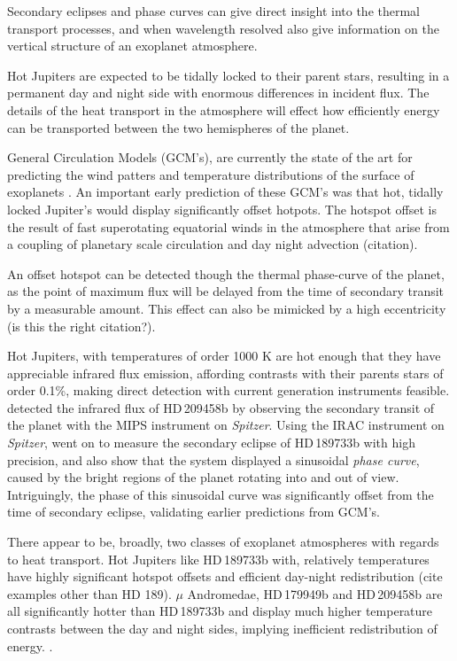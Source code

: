 \documentclass[a4paper,fleqn,usenatbib]{mnras}
\begin{document}
Secondary eclipses and phase curves can give direct insight into the thermal transport processes, and when wavelength resolved also give information on the vertical structure of an exoplanet atmosphere.

Hot Jupiters are expected to be tidally locked to their parent stars, resulting in a permanent day and night side with enormous differences in incident flux. The details of the heat transport in the atmosphere will effect how efficiently energy can be transported between the two hemispheres of the planet.

General Circulation Models (GCM's), are currently the state of the art for predicting the wind patters and temperature distributions of the surface of exoplanets \citep[e.g.][]{Showman2008}. An important early prediction of these GCM's was that hot, tidally locked Jupiter's would display significantly offset hotpots. The hotspot offset is the result of fast superotating equatorial winds in the atmosphere that arise from a coupling of planetary scale circulation and day night advection (citation).

An offset hotspot can be detected though the thermal phase-curve of the planet, as the point of maximum flux will be delayed from the time of secondary transit by a measurable amount. This effect can also be mimicked by a high eccentricity \citep{J.deWit2012a} (is this the right citation?). 

Hot Jupiters, with temperatures of order 1000 K are hot enough that they have appreciable infrared flux emission, affording contrasts with their parents stars of order 0.1\%, making direct detection with current generation instruments feasible. \citet{Deming2005} detected the infrared flux of HD\,209458b by observing the secondary transit of the planet with the MIPS instrument on \emph{Spitzer}. Using the IRAC instrument on \emph{Spitzer}, \citet{Knutson2007b} went on to measure the secondary eclipse of HD\,189733b with high precision, and also show that the system displayed a sinusoidal \emph{phase curve}, caused by the bright regions of the planet rotating into and out of view. Intriguingly, the phase of this sinusoidal curve was significantly offset from the time of secondary eclipse, validating earlier predictions from GCM's.

There appear to be, broadly, two classes of exoplanet atmospheres with regards to heat transport. Hot Jupiters like HD\,189733b with, relatively temperatures have highly significant hotspot offsets and efficient day-night redistribution (cite examples other than HD 189). $\mu$ Andromedae, HD\,179949b and HD\,209458b are all significantly hotter than HD\,189733b and display much higher temperature contrasts between the day and night sides, implying inefficient redistribution of energy. \citep{Harrington2006,Cowan2007,zellem2014}. 
\end{document}
